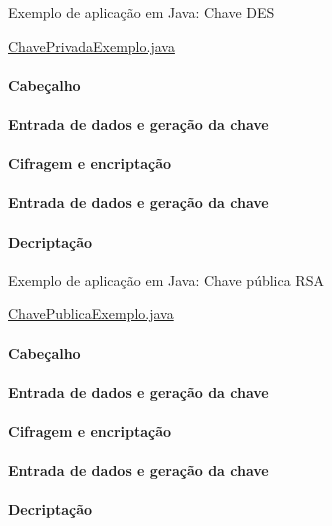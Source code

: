 \begin{frame}[fragile]{Exemplo de aplicação em Java: Chave DES}

\noindent \href{http://book.holanda.xyz/sec/src/crypto/ChavePrivadaExemplo.java}{ChavePrivadaExemplo.java}

 {
\framesubtitle{Cabeçalho}

}  


 {
\framesubtitle{Entrada de dados e geração da chave}

}  


 {
\framesubtitle{Cifragem e encriptação}

}  

 {
\framesubtitle{Entrada de dados e geração da chave}
  
}  

 {
  \framesubtitle{Decriptação}
   
}  



\end{frame}

\begin{frame}[fragile]{Exemplo de aplicação em Java: Chave pública RSA}

\noindent \href{http://book.holanda.xyz/sec/src/crypto/ChavePublicaExemplo.java}{ChavePublicaExemplo.java}

 {
\framesubtitle{Cabeçalho}

}  


 {
\framesubtitle{Entrada de dados e geração da chave}

}  


 {
\framesubtitle{Cifragem e encriptação}

}  

 {
\framesubtitle{Entrada de dados e geração da chave}
  
}  

 {
  \framesubtitle{Decriptação}
   
}  

\end{frame}


